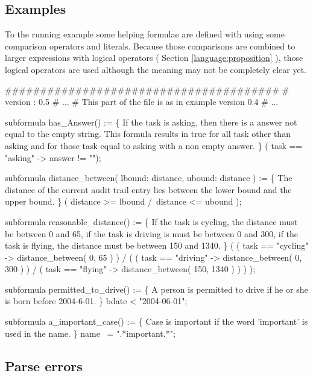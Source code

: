 \subsection{Examples}

To the running example some helping formulae are defined with using some
comparison operators and literals. Because those comparisons are combined to
larger expressions with logical operators ( Section \ref{language:proposition}
), those logical operators are used although the meaning may not be completely
clear yet.

\begin{ltlcode}
#######################################
# version : 0.5
# ... 
# This part of the file is as in example version 0.4
# ...

subformula has_Answer() := \{
 If the task is asking, then there is a answer not equal to the empty string.
 This formula results in true for all task other than asking and for those
 task equal to asking with a non empty answer.
\}
  ( task == "asking" -> answer != "");

subformula distance_between( lbound: distance, ubound: distance ) := \{
 The distance of the current audit trail entry lies between the lower bound
 and the upper bound. \}
  ( distance >= lbound /\ distance <= ubound );

subformula reasonable_distance() := \{
 If the task is cycling, the distance must be between 0 and 65, if the task
 is driving is must be between 0 and 300, if the task is flying, the distance
 must be between 150 and 1340. \}
  (    ( task == "cycling" -> distance_between( 0, 65 )     ) /\bs
    (  ( task == "driving" -> distance_between( 0, 300 )    ) /\bs
       ( task == "flying"  -> distance_between( 150, 1340 ) )
    )
  );

subformula permitted_to_drive() := \{
 A person is permitted to drive if he or she is born before 2004-6-01. \}
  bdate < "2004-06-01";

subformula a_important_case() := \{
 Case is important if the word 'important' is used in the name. \}
  name ~= ".*important.*";  
\end{ltlcode}

\subsection{Parse errors}

